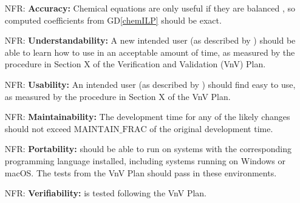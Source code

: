\documentclass[12pt]{article}
\newcommand{\gdref}[1]{GD\ref{#1}}
\newcounter{nfrnum} %
\begin{document}
\begin{itemize}

  \item[NFR\refstepcounter{nfrnum}\thenfrnum \label{NFR_accuracy}:]
    \textbf{Accuracy:} Chemical equations are only useful if they are balanced
    \cite{lund_introduction_2023}, so computed coefficients from \gdref{chemILP}
    should be exact.



  \item[NFR\refstepcounter{nfrnum}\thenfrnum \label{NFR_understandability}:]
    \textbf{Understandability:} A new intended user (as described by
    ) should be able to learn how to use \progname{} in an
    acceptable amount of time, as measured by the procedure in Section X of
    the Verification and Validation (VnV) Plan.

  \item[NFR\refstepcounter{nfrnum}\thenfrnum \label{NFR_usability}:]
    \textbf{Usability:} An intended user (as described by )
    should find \progname{} easy to use, as measured by the procedure in Section X
    of the VnV Plan.

  \item[NFR\refstepcounter{nfrnum}\thenfrnum \label{NFR_maintainability}:]
    \textbf{Maintainability:} The development time for any of the likely
    changes should not exceed $\text{MAINTAIN\_FRAC}$ of the original
    development time.

  \item[NFR\refstepcounter{nfrnum}\thenfrnum \label{NFR_portability}:]
    \textbf{Portability:} \progname{} should be able to run on systems with the
    corresponding programming language
    installed, including systems running on Windows or macOS. The tests from
    the VnV Plan should pass in these environments.

  \item[NFR\refstepcounter{nfrnum}\thenfrnum \label{NFR_verifiability}:]
    \textbf{Verifiability:} \progname{} is tested following the VnV Plan.


\end{itemize}
\end{document}
